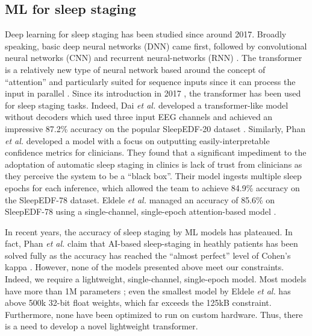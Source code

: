 \documentclass[12pt, hidelinks]{article}
\begin{document}
    \subsection{ML for sleep staging}
    Deep learning for sleep staging has been studied since around 2017. Broadly speaking, basic deep neural networks (DNN) came first, followed by convolutional neural networks (CNN) and recurrent neural-networks (RNN) \cite{phan2022sleeptransformer}.
    The transformer is a relatively new type of neural network based around the concept of ``attention'' and particularly suited for sequence inputs since it can process the input in parallel \cite{han2022survey}. Since its introduction in 2017 \cite{vaswani2017attention}, 
    the transformer has been used for sleep staging tasks. Indeed, Dai \textit{et al.} developed a transformer-like model without decoders which used three input EEG channels and achieved an impressive 87.2\% accuracy on the popular SleepEDF-20 dataset
    \cite{dai2023multichannelsleepnet}. Similarly, Phan \textit{et al.} developed a model with a focus on outputting easily-interpretable confidence metrics for clinicians. They found that a significant impediment to the adoptation of automatic sleep staging in clinics
    is lack of trust from clinicians as they perceive the system to be a ``black box''. Their model ingests multiple sleep epochs for each inference, which allowed the team to achieve 84.9\% accuracy on the SleepEDF-78 dataset. Eldele \textit{et al.} managed an
    accuracy of 85.6\% on SleepEDF-78 using a single-channel, single-epoch attention-based model \cite{eldele2021attention}.

    In recent years, the accuracy of sleep staging by ML models has plateaued. In fact, Phan \textit{et al.} claim that AI-based sleep-staging in heathly patients has been solved fully as the accuracy has reached the ``almost perfect'' level of Cohen's kappa
    \cite{phan2022automatic}. However, none of the models presented above meet our constraints. Indeed, we require a lightweight, single-channel, single-epoch model. Most models have more than 1M parameters \cite{phan2022sleeptransformer}; even the smallest
    model by Eldele \textit{et al.} has above 500k 32-bit float weights, which far exceeds the 125kB constraint. Furthermore, none have been optimized to run on custom hardware. Thus, there is a need to develop a novel lightweight transformer.

\end{document}
